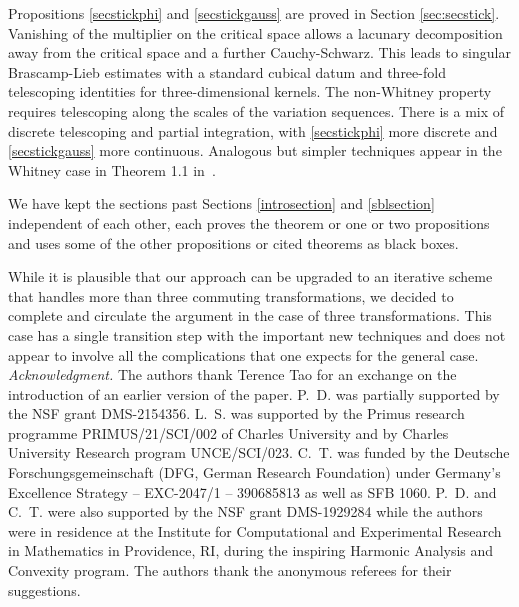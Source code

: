 \documentclass[12pt,reqno]{amsart}
\theoremstyle{plain}
\theoremstyle{definition}
\numberwithin{equation}{section}
\begin{document}
 Propositions 
 \ref{secstickphi} and \ref{secstickgauss} are proved in
 Section \ref{sec:secstick}. Vanishing of the multiplier
 on the critical space
 allows a lacunary decomposition away from the critical space 
 and a further Cauchy-Schwarz. This leads to
 singular Brascamp-Lieb estimates with a standard 
 cubical datum and three-fold telescoping identities for
 three-dimensional kernels. The non-Whitney property requires
 telescoping along the scales of the variation sequences.
 There is a mix of discrete telescoping and partial integration, with \ref{secstickphi} more discrete and
 \ref{secstickgauss} more continuous. Analogous but simpler techniques appear in  the Whitney case in Theorem 1.1 in~\cite{MR4510172}.
 
 
 









We have kept the sections past Sections 
\ref{introsection} and \ref{sblsection} independent
of each other, each proves the theorem or one or two propositions and uses some of the other propositions or cited theorems as black boxes.
 
While it is plausible that our approach can be upgraded to an iterative scheme that handles more than three commuting transformations, we decided to complete and circulate the argument in the case of three transformations.
This case has a single 
transition step with the important  new techniques and 
does not appear to involve all
the complications that one expects for the general case.
 \\



 \textit{Acknowledgment.} 
The authors thank Terence Tao for an exchange on the introduction of an earlier version of the paper.
 P.~D.  was partially supported by the NSF grant DMS-2154356. L.~S. was supported by the Primus research programme PRIMUS/21/SCI/002 of Charles University and by Charles University Research program
UNCE/SCI/023. 
C.~T. was funded by the Deutsche Forschungsgemeinschaft (DFG, German Research Foundation) under Germany's Excellence Strategy -- EXC-2047/1 -- 390685813 as well as SFB 1060.
P.~D. and C.~T. were also supported by the NSF grant DMS-1929284 while the authors were in residence at the Institute for Computational and Experimental Research in Mathematics in Providence, RI, during the inspiring Harmonic Analysis and Convexity program.   The authors thank the anonymous referees for their suggestions.
\end{document}
